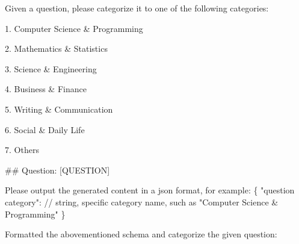\begin{tcolorbox}[breakable, title=Question Type Categorization Prompt, label=More Cases]
\small
\ttfamily
Given a question, please categorize it to one of the following categories:

\vspace{4mm}
1. Computer Science \& Programming

2. Mathematics \& Statistics

3. Science \& Engineering

4. Business \& Finance

5. Writing \& Communication

6. Social \& Daily Life

7. Others

\vspace{4mm}
\#\# Question: [QUESTION]

\vspace{4mm}
Please output the generated content in a json format, for example:
\{
"question category": // string, specific category name, such as "Computer Science \& Programming"
\}

\vspace{4mm}
Formatted the abovementioned schema and categorize the given question:


\end{tcolorbox}
\label{}